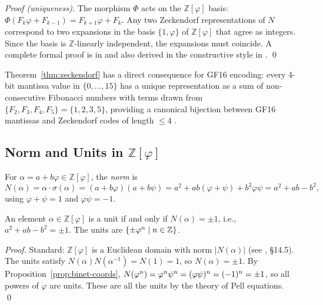 \begin{proof}[Proof (uniqueness)]
The morphism \(\Phi\) acts on the \(\mathbb{Z}[\varphi]\) basis:
\(\Phi(F_k\varphi + F_{k-1}) = F_{k+1}\varphi + F_k\).
Any two Zeckendorf representations of \(N\) correspond to two expansions in
the basis \(\{1, \varphi\}\) of \(\mathbb{Z}[\varphi]\) that agree
as integers.  Since the basis is \(\mathbb{Z}\)-linearly independent, the
expansions must coincide.
A complete formal proof is in \cite{zeckendorf1972} and also derived in the
constructive style in \cite{koshy_fib_lucas}.
\qed
\end{proof}

\begin{remark}
Theorem~\ref{thm:zeckendorf} has a direct consequence for GF16 encoding:
every 4-bit mantissa value in \(\{0,\ldots,15\}\) has a unique representation
as a sum of non-consecutive Fibonacci numbers with terms drawn from
\(\{F_2,F_3,F_4,F_5\} = \{1,2,3,5\}\), providing a canonical bijection
between GF16 mantissas and Zeckendorf codes of length \(\leq 4\)
\cite{koshy_fib_lucas}.
\end{remark}

\subsection{Norm and Units in \(\mathbb{Z}[\varphi]\)}\label{subsec:ch7-norm}

\begin{definition}\label{def:norm}
For \(\alpha = a + b\varphi \in \mathbb{Z}[\varphi]\),
the \emph{norm} is
\[
  N(\alpha) = \alpha \cdot \sigma(\alpha) = (a+b\varphi)(a+b\psi)
  = a^2 + ab(\varphi+\psi) + b^2\varphi\psi
  = a^2 + ab - b^2,
\]
using \(\varphi + \psi = 1\) and \(\varphi\psi = -1\).
\end{definition}

\begin{proposition}\label{prop:units}
An element \(\alpha \in \mathbb{Z}[\varphi]\) is a unit if and only if
\(N(\alpha) = \pm 1\), i.e., \(a^2 + ab - b^2 = \pm 1\).
The units are \(\{\pm\varphi^{n} \mid n \in \mathbb{Z}\}\).
\end{proposition}

\begin{proof}
Standard: \(\mathbb{Z}[\varphi]\) is a Euclidean domain with norm \(|N(\alpha)|\)
(see \cite{hardy_wright}, §14.5).  The units satisfy
\(N(\alpha)N(\alpha^{-1}) = N(1) = 1\), so \(N(\alpha) = \pm 1\).
By Proposition~\ref{prop:binet-coords}, \(N(\varphi^{n}) = \varphi^{n}\psi^n
= (\varphi\psi)^n = (-1)^n = \pm 1\), so all powers of \(\varphi\) are units.
These are all the units by the theory of Pell equations.
\qed
\end{proof}

